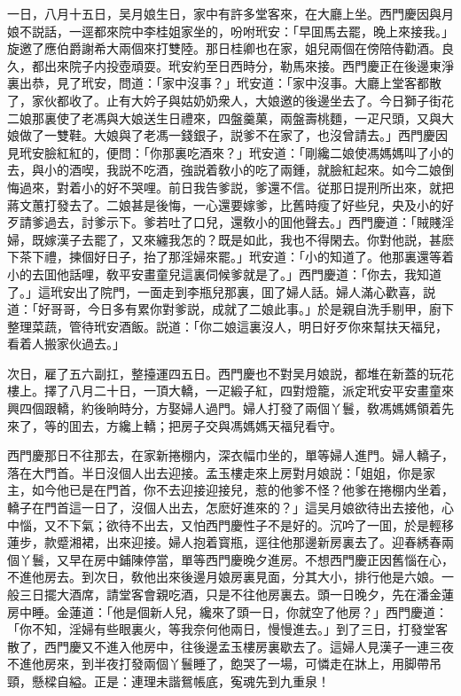 一日，八月十五日，吴月娘生日，家中有許多堂客來，在大廳上坐。西門慶因與月娘不説話，一逕都來院中李桂姐家坐的，吩咐玳安：「早囬馬去罷，晚上來接我。」旋邀了應伯爵謝希大兩個來打雙陸。那日桂卿也在家，姐兒兩個在傍陪侍勸酒。良久，都出來院子内投壺頑耍。玳安約至日西時分，勒馬來接。西門慶正在後邊東淨裏出恭，見了玳安，問道：「家中沒事？」玳安道：「家中沒事。大廳上堂客都散了，家伙都收了。止有大妗子與姑奶奶衆人，大娘邀的後邊坐去了。今日獅子街花二娘那裏使了老馮與大娘送生日禮來，四盤羹菓，兩盤壽桃麵，一疋尺頭，又與大娘做了一雙鞋。大娘與了老馮一錢銀子，説爹不在家了，也沒曾請去。」西門慶因見玳安臉紅紅的，便問：「你那裏吃酒來？」玳安道：「剛纔二娘使馮媽媽叫了小的去，與小的酒喫，我説不吃酒，強説着敎小的吃了兩鍾，就臉紅起來。如今二娘倒悔過來，對着小的好不哭哩。前日我告爹説，爹還不信。従那日提刑所出來，就把蔣文蕙打發去了。二娘甚是後悔，一心還要嫁爹，比舊時瘦了好些兒，央及小的好歹請爹過去，討爹示下。爹若吐了口兒，還敎小的囬他聲去。」西門慶道：「賊賤淫婦，既嫁漢子去罷了，又來纏我怎的？既是如此，我也不得閑去。你對他説，甚麽下茶下禮，揀個好日子，抬了那淫婦來罷。」玳安道：「小的知道了。他那裏還等着小的去囬他話哩，敎平安畫童兒這裏伺候爹就是了。」西門慶道：「你去，我知道了。」這玳安出了院門，一面走到李瓶兒那裏，囬了婦人話。婦人滿心歡喜，説道：「好哥哥，今日多有累你對爹説，成就了二娘此事。」於是親自洗手剔甲，廚下整理菜蔬，管待玳安酒飯。説道：「你二娘這裏沒人，明日好歹你來幫扶天福兒，看着人搬家伙過去。」

次日，雇了五六副扛，整擡運四五日。西門慶也不對吴月娘説，都堆在新蓋的玩花樓上。擇了八月二十日，一頂大轎，一疋緞子紅，四對燈籠，派定玳安平安畫童來興四個跟轎，約後晌時分，方娶婦人過門。婦人打發了兩個丫鬟，敎馮媽媽領着先來了，等的囬去，方纔上轎；把房子交與馮媽媽天福兒看守。

西門慶那日不往那去，在家新捲棚内，深衣幅巾坐的，單等婦人進門。婦人轎子，落在大門首。半日沒個人出去迎接。孟玉樓走來上房對月娘説：「姐姐，你是家主，如今他已是在門首，你不去迎接迎接兒，惹的他爹不怪？他爹在捲棚内坐着，轎子在門首這一日了，沒個人出去，怎麽好進來的？」這吴月娘欲待出去接他，心中惱，又不下氣；欲待不出去，又怕西門慶性子不是好的。沉吟了一囬，於是輕移蓮步，款蹙湘裙，出來迎接。婦人抱着寳瓶，逕往他那邊新房裏去了。迎春綉春兩個丫鬟，又早在房中鋪陳停當，單等西門慶晚夕進房。不想西門慶正因舊惱在心，不進他房去。到次日，敎他出來後邊月娘房裏見面，分其大小，排行他是六娘。一般三日擺大酒席，請堂客會親吃酒，只是不往他房裏去。頭一日晚夕，先在潘金蓮房中睡。金蓮道：「他是個新人兒，纔來了頭一日，你就空了他房？」西門慶道：「你不知，淫婦有些眼裏火，等我奈何他兩日，慢慢進去。」到了三日，打發堂客散了，西門慶又不進入他房中，往後邊孟玉樓房裏歇去了。這婦人見漢子一連三夜不進他房來，到半夜打發兩個丫鬟睡了，飽哭了一場，可憐走在牀上，用脚帶吊頸，懸樑自縊。正是：連理未諧鴛帳底，寃魂先到九重泉！

